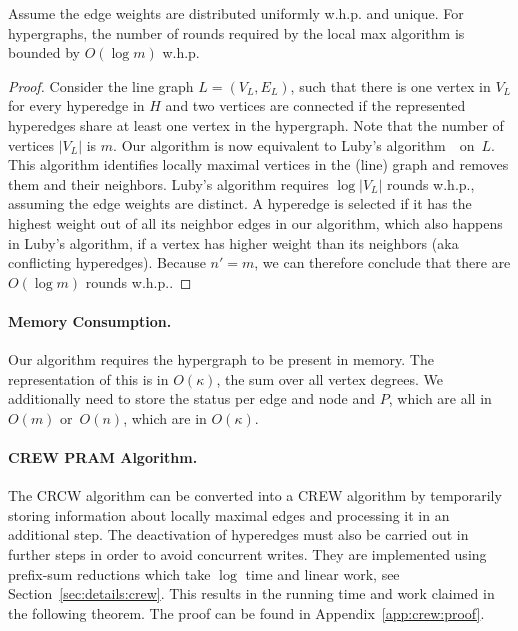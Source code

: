 \documentclass[runningheads]{llncs}
\begin{document}
\begin{claim}\label{thrm:rounds}
Assume the edge weights are distributed uniformly w.h.p. and unique. For hypergraphs, the number of rounds required by the local max algorithm  is bounded by $O(\log{m})$ w.h.p. %
\end{claim}
\begin{proof}
        Consider the line graph $L=(V_L,E_L)$, such that there is one vertex in $V_L$ for every hyperedge in $H$ and two vertices are connected if the represented hyperedges share at least one vertex in the hypergraph.
        Note that the number of vertices $\left|V_L\right|$ is $m$. 
        Our algorithm is now equivalent to Luby's algorithm~\cite{luby1985simple}~on~$L$. This algorithm identifies locally maximal vertices in the (line) graph and removes them and their neighbors.
        Luby's algorithm requires $\log{|V_L|}$ rounds w.h.p., assuming the edge weights are distinct. 
        A hyperedge is selected if it has the highest weight out of all its neighbor edges in our algorithm, which also happens in Luby's algorithm, if a vertex has higher weight than its neighbors (aka conflicting hyperedges).
        Because $n'=m$, we can therefore conclude that there are $O(\log{m})$ rounds w.h.p..
\end{proof}




\paragraph{Memory Consumption.} Our algorithm requires the hypergraph to be present in memory. The representation of this is in $O(\kappa)$, the sum over all vertex degrees.  We additionally need to store the status per edge and node and $P$, which are all in~$O(m)$ or~$O(n)$, which  are in $O(\kappa)$.
\paragraph{CREW PRAM Algorithm.} \label{section:CREW}
The CRCW algorithm can be converted into a CREW algorithm by temporarily storing information about locally maximal edges and processing it in an additional step. The deactivation of hyperedges must also be carried out in further steps in order to avoid concurrent writes.
They are implemented using prefix-sum reductions which take $\log{}$ time and linear work, see Section~\ref{sec:details:crew}.
This results in the running time and work claimed in the following theorem. The proof can be found in Appendix~\ref{app:crew:proof}.
\end{document}
